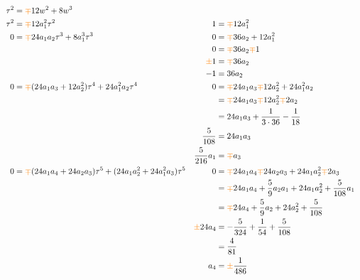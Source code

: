 \documentclass{article}
\begin{document}
\begin{align*}
\tau^2 & = \textcolor{orange}{\mp}12w^2 + 8w^3\\
\tau^2 & = \textcolor{orange}{\mp}12 a_1^2 \tau^2 & 1 & = \textcolor{orange}{\mp}12 a_1^2 \\
0 & = \textcolor{orange}{\mp}24 a_1 a_2 \tau^3 + 8a_1^3 \tau^3 & 0 & = \textcolor{orange}{\mp}36 a_2 + 12 a_1^2 \\
& & 0 & = \textcolor{orange}{\mp}36 a_2 \textcolor{orange}{\mp} 1 \\
& & \textcolor{orange}{\pm}1 & = \textcolor{orange}{\mp}36 a_2 \\
& & -1 & = 36 a_2 \\
0 & = \textcolor{orange}{\mp}(24a_1 a_3 + 12 a_2^2) \tau^4 + 24 a_1^2 a_2 \tau^4 & 0 & = \textcolor{orange}{\mp}24 a_1 a_3 \textcolor{orange}{\mp} 12 a_2^2 + 24 a_1^2 a_2 \\
& & & = \textcolor{orange}{\mp}24 a_1 a_3 \textcolor{orange}{\mp} 12 a_2^2 \textcolor{orange}{\mp} 2 a_2 \\
& & & = 24 a_1 a_3 + \frac{1}{3 \cdot 36} - \frac{1}{18} \\
& & \frac{5}{108} & = 24 a_1 a_3 \\
& & \frac{5}{216} a_1 & = \textcolor{orange}{\mp}a_3 \\
0 & = \textcolor{orange}{\mp}(24 a_1 a_4 + 24 a_2 a_3) \tau^5 + (24 a_1 a_2^2 + 24 a_1^2 a_3) \tau^5 & 0 & = \textcolor{orange}{\mp}24 a_1 a_4 \textcolor{orange}{\mp} 24 a_2 a_3 + 24 a_1 a_2^2 \textcolor{orange}{\mp} 2 a_3 \\
& & & = \textcolor{orange}{\mp}24 a_1 a_4 + \frac{5}{9} a_2 a_1 + 24 a_1 a_2^2 + \frac{5}{108} a_1 \\
& & & = \textcolor{orange}{\mp}24 a_4 + \frac{5}{9} a_2 + 24 a_2^2 + \frac{5}{108} \\
& & \textcolor{orange}{\pm}24 a_4 & = -\frac{5}{324} + \frac{1}{54} + \frac{5}{108} \\
& & & = \frac{4}{81} \\
& & a_4 & = \textcolor{orange}{\pm} \frac{1}{486}
\end{align*}
\end{document}
